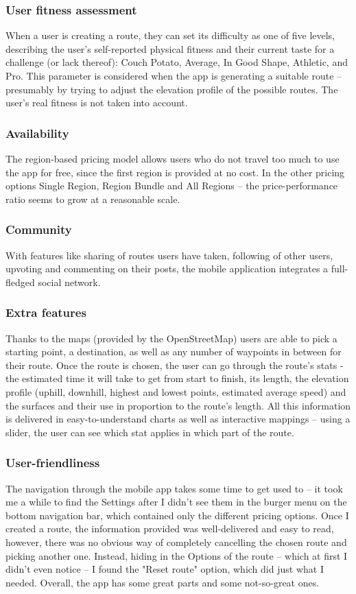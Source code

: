 \subsubsection*{User fitness assessment} When a user is creating a route, they can set its difficulty as one of five levels, 
describing the user's self-reported physical fitness and their current taste for a challenge (or lack thereof): Couch Potato, Average, In Good Shape, Athletic, and Pro.
This parameter is considered when the app is generating a suitable route -- presumably by trying to adjust the elevation profile of the possible routes.
The user's real fitness is not taken into account.
\subsubsection*{Availability} The region-based pricing model allows users who do not travel too much to use the app for free,
since the first region is provided at no cost.
In the other pricing options Single Region, Region Bundle and All Regions -- the price-performance ratio seems to grow at a reasonable scale.
\subsubsection*{Community} With features like sharing of routes users have taken, following of other users, upvoting and commenting on their posts, the mobile application integrates a full-fledged social network.
\subsubsection*{Extra features} Thanks to the maps (provided by the OpenStreetMap) users are able to pick a starting point, a destination, as well as any number of waypoints in between for their route.
Once the route is chosen, the user can go through the route's stats - the estimated time it will take to get from start to finish, its length, the elevation profile (uphill, downhill, highest and lowest points, estimated average speed) and the surfaces and their use in proportion to the route's length.
All this information is delivered in easy-to-understand charts as well as interactive mappings -- using a slider, the user can see which stat applies in which part of the route.
\subsubsection*{User-friendliness} The navigation through the mobile app takes some time to get used to -- it took me a while to find the Settings after I didn't see them in the burger menu on the bottom navigation bar, which contained only the different pricing options.
Once I created a route, the information provided was well-delivered and easy to read, however, there was no obvious way of completely cancelling the chosen route and picking another one.
Instead, hiding in the Options of the route -- which at first I didn't even notice -- I found the "Reset route" option, which did just what I needed.
Overall, the app has some great parts and some not-so-great ones.

